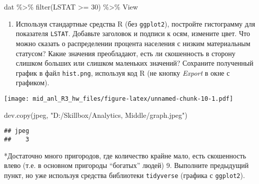 \documentclass[
]{article}
\newenvironment{Shaded}{\begin{snugshade}}{\end{snugshade}}
\newcommand{\AttributeTok}[1]{\textcolor[rgb]{0.77,0.63,0.00}{#1}}
\newcommand{\DecValTok}[1]{\textcolor[rgb]{0.00,0.00,0.81}{#1}}
\newcommand{\FunctionTok}[1]{\textcolor[rgb]{0.00,0.00,0.00}{#1}}
\newcommand{\NormalTok}[1]{#1}
\newcommand{\SpecialCharTok}[1]{\textcolor[rgb]{0.00,0.00,0.00}{#1}}
\newcommand{\StringTok}[1]{\textcolor[rgb]{0.31,0.60,0.02}{#1}}
\providecommand{\tightlist}{%
  \setlength{\itemsep}{0pt}\setlength{\parskip}{0pt}}
\begin{document}
\begin{Shaded}
\begin{Highlighting}[]
\NormalTok{dat }\SpecialCharTok{\%\textgreater{}\%} \FunctionTok{filter}\NormalTok{(LSTAT }\SpecialCharTok{\textgreater{}=} \DecValTok{30}\NormalTok{) }\SpecialCharTok{\%\textgreater{}\%}\NormalTok{ View}
\end{Highlighting}
\end{Shaded}

\begin{enumerate}
\def\labelenumi{\arabic{enumi}.}
\setcounter{enumi}{7}
\tightlist
\item
  Используя стандартные средства R (без \texttt{ggplot2}), постройте
  гистограмму для показателя \texttt{LSTAT}. Добавьте заголовок и
  подписи к осям, измените цвет. Что можно сказать о распределении
  процента населения с низким материальным статусом? Какие значения
  преобладают, есть ли скошенность в сторону слишком больших или слишком
  маленьких значений? Сохраните полученный график в файл
  \texttt{hist.png}, используя код R (не кнопку \emph{Export} в окне с
  графиком).
\end{enumerate}

\begin{Shaded}
\end{Shaded}

\texttt{[image: mid\_anl\_R3\_hw\_files/figure-latex/unnamed-chunk-10-1.pdf]}

\begin{Shaded}
\begin{Highlighting}[]
\FunctionTok{dev.copy}\NormalTok{(jpeg, }\StringTok{"D:/Skillbox/Analytics, Middle/graph.jpeg"}\NormalTok{)}
\end{Highlighting}
\end{Shaded}

\begin{verbatim}
## jpeg 
##    3
\end{verbatim}

*Достаточно много пригородов, где количество крайне мало, есть
скошенность влево (т.е. в основном пригороды ``богатых'' людей) 9.
Выполните предыдущий пункт, но уже используя средства библиотеки
\texttt{tidyverse} (графика с \texttt{ggplot2}).
\end{document}
